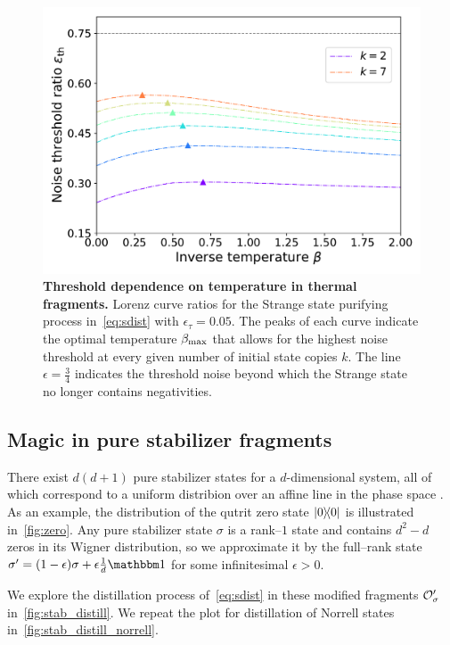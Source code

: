\documentclass[pra,
aps,
twocolumn,
superscriptaddress,
groupedaddress,
nofootinbib,
reprint
]{revtex4-1}
\begin{document}
\begin{figure}
    \centering
    \includegraphics[scale=0.5]{figs/thermal_distill.pdf}
    \caption{\textbf{Threshold dependence on temperature in thermal fragments.} Lorenz curve ratios for the Strange state purifying process in~\cref{eq:sdist} with $\epsilon_\tau = 0.05$.
    The peaks of each curve indicate the optimal temperature $\beta_{\rm{max}}$ that allows for the highest noise threshold at every given number of initial state copies $k$.
    The line $\epsilon = \frac{3}{4}$ indicates the threshold noise beyond which the Strange state no longer contains negativities.
    }
    \label{fig:thermal_distill}
\end{figure}

\newpage

\subsection{Magic in pure stabilizer fragments}\label{sec:magstab}

There exist $d(d+1)$ pure stabilizer states for a $d$-dimensional system, all of which correspond to a uniform distribion over an affine line in the phase space .
As an example, the distribution of the qutrit zero state $\ketbra{0}$ is illustrated in~\cref{fig:zero}.
Any pure stabilizer state $\sigma$ is a rank--$1$ state and contains $d^2 - d$ zeros in its Wigner distribution, so we approximate it by the full--rank state $\sigma' = (1-\epsilon)\sigma + \epsilon \frac{1}{d}\id$ for some infinitesimal $\epsilon > 0$.

We explore the distillation process of~\cref{eq:sdist} in these modified fragments $\mathcal{O}_\sigma'$ in~\cref{fig:stab_distill}.
We repeat the plot for distillation of Norrell states in~\cref{fig:stab_distill_norrell}.
\end{document}
